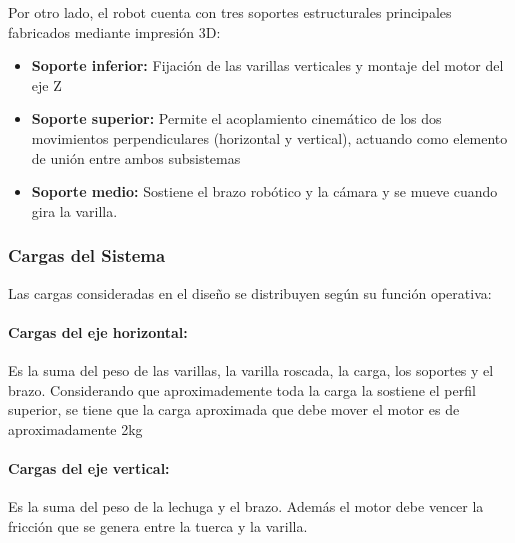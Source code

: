 Por otro lado, el robot cuenta con tres soportes estructurales principales fabricados mediante impresión 3D:

\begin{itemize}
    \item \textbf{Soporte inferior:} Fijación de las varillas verticales y montaje del motor del eje Z
    \item \textbf{Soporte superior:} Permite el acoplamiento cinemático de los dos movimientos perpendiculares (horizontal y vertical), actuando como elemento de unión entre ambos subsistemas
    \item \textbf{Soporte medio:} Sostiene el brazo robótico y la cámara y se mueve cuando gira la varilla.
\end{itemize}

\subsubsection{Cargas del Sistema}

Las cargas consideradas en el diseño se distribuyen según su función operativa:

\paragraph{Cargas del eje horizontal:}
Es la suma del peso de las varillas, la varilla roscada, la carga, los soportes y el brazo. Considerando que aproximademente toda la carga la sostiene el perfil superior, se tiene que la carga aproximada que debe mover el motor es de aproximadamente 2kg

\paragraph{Cargas del eje vertical:}
Es la suma del peso de la lechuga y el brazo. Además el motor debe vencer la fricción que se genera entre la tuerca y la varilla.

